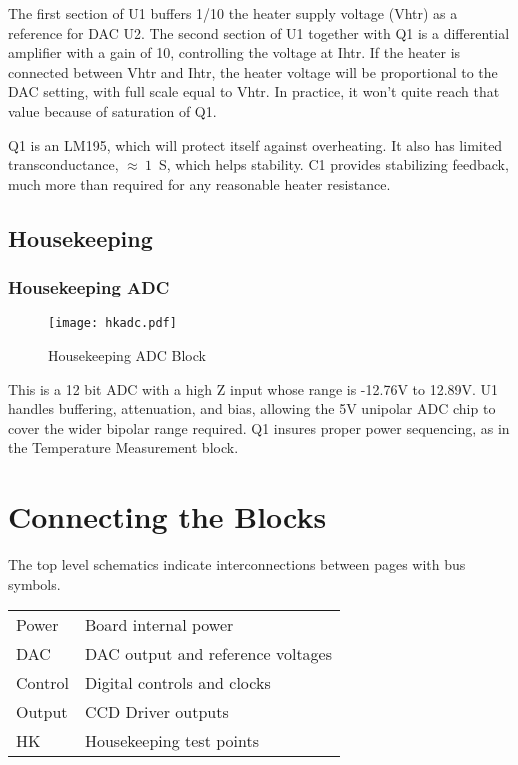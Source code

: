 The first section of U1 buffers 1/10 the heater supply voltage (Vhtr) as a reference for DAC U2. The second section of U1 together with Q1 is a differential amplifier with a gain of 10, controlling the voltage at Ihtr.  If the heater is connected between Vhtr and Ihtr, the heater voltage will be proportional to the DAC setting, with full scale equal to Vhtr. In practice, it won't quite reach that value because of saturation of Q1.

Q1 is an LM195, which will protect itself against overheating. It also has limited transconductance, $\approx\ 1$\ S, which helps stability. C1 provides stabilizing feedback, much more than required for any reasonable heater resistance.

\subsection{Housekeeping}

\subsubsection{Housekeeping ADC}
   \begin{figure}
   \begin{center}
   \texttt{[image: hkadc.pdf]}
   \end{center}
   \caption{Housekeeping ADC Block}
   \end{figure}

This is a 12 bit ADC with a high Z input whose range is -12.76V to 12.89V. U1 handles buffering, attenuation, and bias, allowing the 5V unipolar ADC chip to cover the wider bipolar range required. Q1 insures proper power sequencing, as in the Temperature Measurement block.

\section{Connecting the Blocks}

The top level schematics indicate interconnections between pages with bus symbols.

\begin{tabular}{ll}
Power & Board internal power \\
DAC & DAC output and reference voltages \\
Control & Digital controls and clocks \\
Output & CCD Driver outputs \\
HK & Housekeeping test points \\
\end{tabular}

